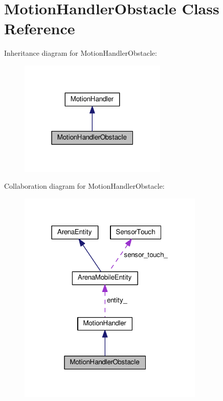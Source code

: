 \hypertarget{classMotionHandlerObstacle}{}\section{Motion\+Handler\+Obstacle Class Reference}
\label{classMotionHandlerObstacle}


Inheritance diagram for Motion\+Handler\+Obstacle\+:\nopagebreak
\begin{figure}[H]
\begin{center}
\leavevmode
\includegraphics[width=199pt]{classMotionHandlerObstacle__inherit__graph}
\end{center}
\end{figure}


Collaboration diagram for Motion\+Handler\+Obstacle\+:\nopagebreak
\begin{figure}[H]
\begin{center}
\leavevmode
\includegraphics[width=250pt]{classMotionHandlerObstacle__coll__graph}
\end{center}
\end{figure}
